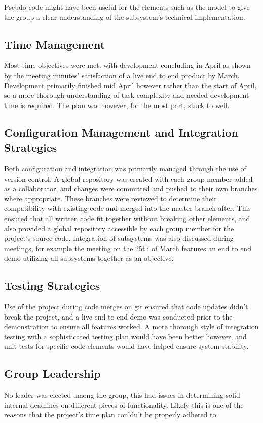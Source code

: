 \documentclass[]{report}
\begin{document}
	Pseudo code might have been useful for the elements such as the model to give the group a clear understanding of the subsystem's technical implementation.
	
	\subsection{Time Management}
	Most time objectives were met, with development concluding in April as shown by the meeting minutes' satisfaction of a live end to end product by March. Development primarily finished mid April however rather than the start of April, so a more thorough understanding of task complexity and needed development time is required. The plan was however, for the most part, stuck to well.
	
	\subsection{Configuration Management and Integration Strategies}
	Both configuration and integration was primarily managed through the use of version control. A global repository was created with each group member added as a collaborator, and changes were committed and pushed to their own branches where appropriate. These branches were reviewed to determine their compatibility with existing code and merged into the master branch after. This ensured that all written code fit together without breaking other elements, and also provided a global repository accessible by each group member for the project's source code. Integration of subsystems was also discussed during meetings, for example the meeting on the 25th of March features an end to end demo utilizing all subsystems together as an objective.
	
	\subsection{Testing Strategies}
	Use of the project during code merges on git ensured that code updates didn't break the project, and a live end to end demo was conducted prior to the demonstration to ensure all features worked. A more thorough style of integration testing with a sophisticated testing plan would have been better however, and unit tests for specific code elements would have helped ensure system stability.
	
	\subsection{Group Leadership}
	No leader was elected among the group, this had issues in determining solid internal deadlines on different pieces of functionality. Likely this is one of the reasons that the project's time plan couldn't be properly adhered to.
	
\end{document}
